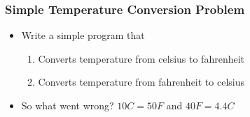 \documentclass[c,mathserif,compress,xcolor=svgnames]{beamer}
\begin{document}
\begin{frame}[fragile]
  \frametitle{Simple Temperature Conversion Problem}
  \begin{itemize}
    \item Write a simple program that 
    \begin{enumerate}
      \item Converts temperature from celsius to fahrenheit
      \item Converts temperature from fahrenheit to celsius
    \end{enumerate}
      \begin{columns}[t]
        Fortran},basicstyle=\fontsize{6}{5}\selectfont\ttfamily]{./Exercise/simple.f90}
        \column{0.6\textwidth}
        \begin{lstlisting}[basicstyle=\fontsize{6}{5}\selectfont\ttfamily]
altair:Exercise apacheco$ gfortran simple.f90
altair:Exercise apacheco$ ./a.out 
 10C =    42.0000000     F
 40F =    0.00000000     C
        \end{lstlisting}
      \end{columns}
    \item So what went wrong? $10C = 50F$ and $40F = 4.4C$
  \end{itemize}
\end{frame}
\end{document}
